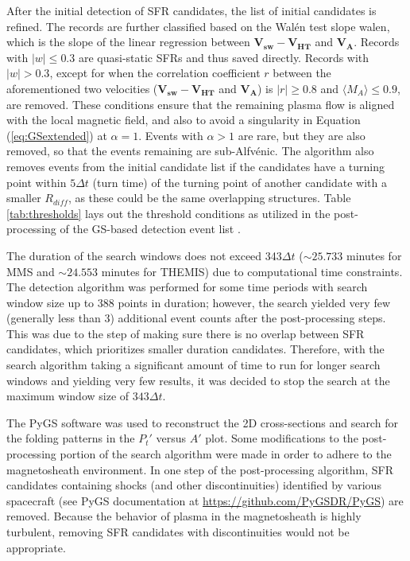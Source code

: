 After the initial detection of SFR candidates, the list of initial candidates is refined. The records are further classified based on the Wal\'en test slope \gls{walen}, which is the slope of the linear regression between $\mathbf{V_{sw}} - \mathbf{V_{HT}}$ and $\mathbf{V_A}$. Records with $|w|\leq0.3$ are quasi-static SFRs and thus saved directly. Records with $|w|>0.3$, except for when the correlation coefficient $r$ between the aforementioned two velocities ($\mathbf{V_{sw}} - \mathbf{V_{HT}}$ and $\mathbf{V_A}$) is $|r|\geq 0.8$ and $\langle M_A\rangle \leq 0.9$, are removed. These conditions ensure that the remaining plasma flow is aligned with the local magnetic field, and also to avoid a singularity in Equation (\ref{eq:GSextended}) at $\alpha=1$. Events with $\alpha>1$ are rare, but they are also removed, so that the events remaining are sub-Alfv\'enic. The algorithm also removes events from the initial candidate list if the candidates have a turning point within $5\Delta t$ (turn time) of the turning point of another candidate with a smaller $R_{diff}$, as these could be the same overlapping structures. Table \ref{tab:thresholds} lays out the threshold conditions as utilized in the post-processing of the GS-based detection event list \citep{Chen:2020, Chen:2021, Chen:2022}.

The duration of the search windows does not exceed 343$\Delta t$ ($\sim 25.733$ minutes for MMS and $\sim 24.553$ minutes for THEMIS) due to computational time constraints. The detection algorithm was performed for some time periods with search window size up to 388 points in duration; however, the search yielded very few (generally less than 3) additional event counts after the post-processing steps. This was due to the step of making sure there is no overlap between SFR candidates, which prioritizes smaller duration candidates. Therefore, with the search algorithm taking a significant amount of time to run for longer search windows and yielding very few results, it was decided to stop the search at the maximum window size of $343\Delta t$.

The PyGS software \citep{Zheng:2018, Hu:2018, Chen:2022, Sonnerup:1996, Hau:1999, HuSonnerup:2002} was used to reconstruct the 2D cross-sections and search for the folding patterns in the $P_t'$ versus $A'$ plot. Some modifications to the post-processing portion of the search algorithm were made in order to adhere to the magnetosheath environment. In one step of the post-processing algorithm, SFR candidates containing shocks (and other discontinuities) identified by various spacecraft (see PyGS documentation at \url{https://github.com/PyGSDR/PyGS}) are removed. Because the behavior of plasma in the magnetosheath is highly turbulent, removing SFR candidates with discontinuities would not be appropriate.

